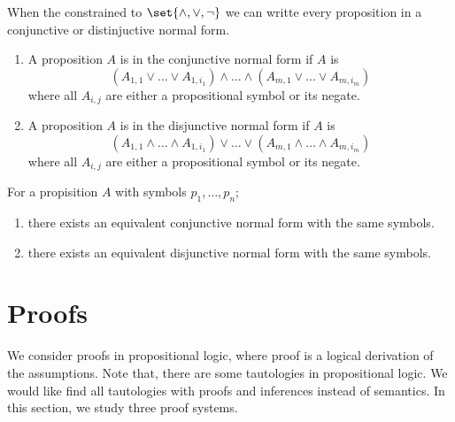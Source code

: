 When the constrained to \(\set{\land,\lor,\neg}\) we can writte every proposition in a conjunctive or distinjuctive normal form. 
\begin{enumerate}
    \item A proposition \(A\) is in the conjunctive normal form if \(A\) is 
    \begin{equation*}
        (A_{1,1} \lor \dots \lor A_{1,i_1}) \land \dots \land (A_{m,1} \lor \dots \lor A_{m,i_m})
    \end{equation*}
    where all \(A_{i,j}\) are either a propositional symbol or its negate.
    \item A proposition \(A\) is in the disjunctive normal form if \(A\) is 
    \begin{equation*}
        (A_{1,1} \land \dots \land A_{1,i_1}) \lor \dots \lor (A_{m,1} \land \dots \land A_{m,i_m})
    \end{equation*}
    where all \(A_{i,j}\) are either a propositional symbol or its negate.
\end{enumerate}

\begin{theorem}
    For a propisition \(A\) with symbols \(p_1,\dots,p_n\);
    \begin{enumerate}
        \item there exists an equivalent conjunctive normal form with the same symbols.
         \item there exists an equivalent disjunctive normal form with the same symbols.
    \end{enumerate}
\end{theorem}

\section{Proofs}
We consider proofs in propositional logic, where proof is a logical derivation of the assumptions. Note that, there are some tautologies in propositional logic. We would like find all tautologies with proofs and inferences instead of semantics. In this section, we study three proof systems.
